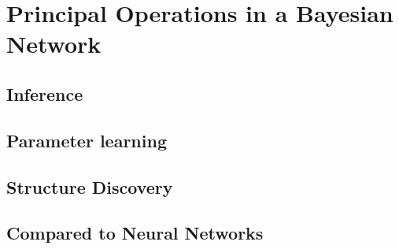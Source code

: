 \section{Principal Operations in a Bayesian Network}

\subsection{Inference}
\subsection{Parameter learning}
\subsection{Structure Discovery}
\subsection{Compared to Neural Networks}